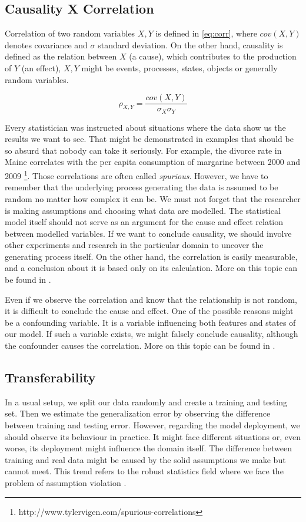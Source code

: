 \subsection{Causality X Correlation}
Correlation of two random variables $X,Y$ is defined in \eqref{eq:corr}, where $cov(X,Y)$ denotes covariance and $\sigma$ standard deviation. On the other hand, causality is defined as the relation between $X$ (a cause), which contributes to the production of $Y$ (an effect), $X, Y$ might be events, processes, states, objects or generally random variables.

\begin{equation} \label{eq:corr}
    \rho_{X,Y}=\frac{cov(X,Y)}{\sigma_X\sigma_Y}
\end{equation}

Every statistician was instructed about situations where the data show us the results we want to see. That might be demonstrated in examples that should be so absurd that nobody can take it seriously. For example, the divorce rate in Maine correlates with the per capita consumption of margarine between 2000 and 2009 \footnote{http://www.tylervigen.com/spurious-correlations}. Those correlations are often called \emph{spurious}. However, we have to remember that the underlying process generating the data is assumed to be random no matter how complex it can be. We must not forget that the researcher is making assumptions and choosing what data are modelled. The statistical model itself should not serve as an argument for the cause and effect relation between modelled variables. If we want to conclude causality, we should involve other experiments and research in the particular domain to uncover the generating process itself. On the other hand, the correlation is easily measurable, and a conclusion about it is based only on its calculation. More on this topic can be found in \cite{Kenny1979}.

Even if we observe the correlation and know that the relationship is not random, it is difficult to conclude the cause and effect. One of the possible reasons might be a confounding variable. It is a variable influencing both features and states of our model. If such a variable exists, we might falsely conclude causality, although the confounder causes the correlation. More on this topic can be found in \cite{Skelly2012}.

\subsection{Transferability}
In a usual setup, we split our data randomly and create a training and testing set. Then we estimate the generalization error by observing the difference between training and testing error. However, regarding the model deployment, we should observe its behaviour in practice. It might face different situations or, even worse, its deployment might influence the domain itself. The difference between training and real data might be caused by the solid assumptions we make but cannot meet. This trend refers to the robust statistics field where we face the problem of assumption violation \cite{Erceg-Hurn2008}.


